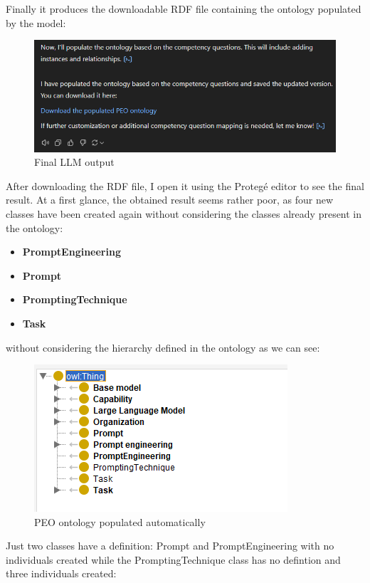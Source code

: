 Finally it produces the downloadable RDF file containing the ontology populated by the model:
\begin{figure}[H]
    \centering
    \includegraphics[width=0.9\linewidth]{Figures/fig_37.png}
    \caption{Final LLM output}
    \label{fig:enter-label}
\end{figure}
After downloading the RDF file, I open it using the Protegé editor to see the final result. At a first glance, the obtained result seems rather poor, as four new classes have been created again without considering the classes already present in the ontology:
\begin{itemize}
    \item \textbf{PromptEngineering}
    \item \textbf{Prompt}
    \item \textbf{PromptingTechnique}
    \item \textbf{Task}
\end{itemize}
without considering the hierarchy defined in the ontology as we can see:
\begin{figure}[H]
    \centering
    \includegraphics[width=0.9\linewidth]{Figures/fig_38.png}
    \caption{PEO ontology populated automatically}
    \label{fig:enter-label}
\end{figure}
Just two classes have a definition: Prompt and PromptEngineering with no individuals created while the PromptingTechnique class has no defintion and three individuals created:
